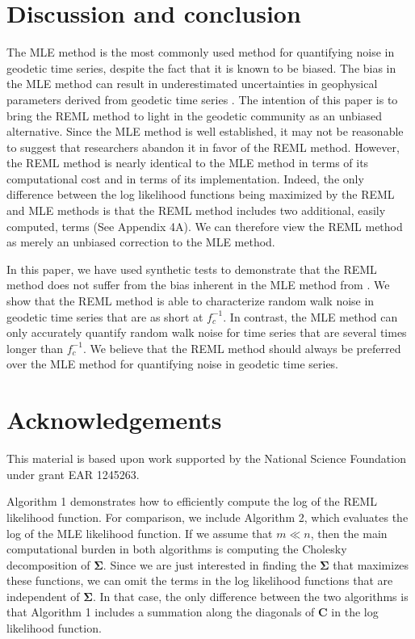 \section{Discussion and conclusion}\label{ch4:sec:conclusion}
The MLE method is the most commonly used method for quantifying noise in geodetic time series, despite the fact that it is known to be biased. The bias in the MLE method can result in underestimated uncertainties in geophysical parameters derived from geodetic time series \citep{Langbein2012}. The intention of this paper is to bring the REML method to light in the geodetic community as an unbiased alternative. Since the MLE method is well established, it may not be reasonable to suggest that researchers abandon it in favor of the REML method.  However, the REML method is nearly identical to the MLE method in terms of its computational cost and in terms of its implementation. Indeed, the only difference between the log likelihood functions being maximized by the REML and MLE methods is that the REML method includes two additional, easily computed, terms (See Appendix 4A). We can therefore view the REML method as merely an unbiased correction to the MLE method.     

In this paper, we have used synthetic tests to demonstrate that the REML method does not suffer from the bias inherent in the MLE method from \citet{Langbein1997}. We show that the REML method is able to characterize random walk noise in geodetic time series that are as short at $f_c^{-1}$. In contrast, the MLE method can only accurately quantify random walk noise for time series that are several times longer than $f_c^{-1}$. We believe that the REML method should always be preferred over the MLE method for quantifying noise in geodetic time series. 

\section{Acknowledgements}
This material is based upon work supported by the National Science Foundation under grant EAR 1245263.

  

Algorithm 1 demonstrates how to efficiently compute the log of the REML likelihood function. For comparison, we include Algorithm 2, which evaluates the log of the MLE likelihood function. If we assume that $m \ll n$, then the main computational burden in both algorithms is computing the Cholesky decomposition of $\mathbf{\Sigma}$. Since we are just interested in finding the $\mathbf{\Sigma}$ that maximizes these functions, we can omit the terms in the log likelihood functions that are independent of $\mathbf{\Sigma}$. In that case, the only difference between the two algorithms is that Algorithm 1 includes a summation along the diagonals of $\mathbf{C}$ in the log likelihood function.    

